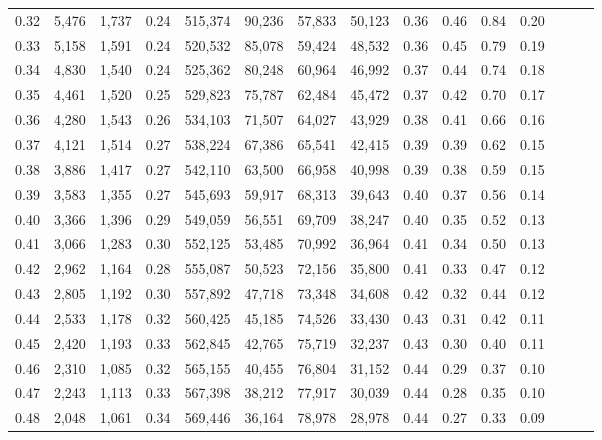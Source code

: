 \begin{tabular}{rrrrrrrrrrrrrrr}
0.32 &   5,476 &  1,737 &  0.24 &  515,374 &   90,236 &   57,833 &   50,123 &  0.36 &  0.46 &  0.84 &      0.20 \\
0.33 &   5,158 &  1,591 &  0.24 &  520,532 &   85,078 &   59,424 &   48,532 &  0.36 &  0.45 &  0.79 &      0.19 \\
0.34 &   4,830 &  1,540 &  0.24 &  525,362 &   80,248 &   60,964 &   46,992 &  0.37 &  0.44 &  0.74 &      0.18 \\
0.35 &   4,461 &  1,520 &  0.25 &  529,823 &   75,787 &   62,484 &   45,472 &  0.37 &  0.42 &  0.70 &      0.17 \\
0.36 &   4,280 &  1,543 &  0.26 &  534,103 &   71,507 &   64,027 &   43,929 &  0.38 &  0.41 &  0.66 &      0.16 \\
0.37 &   4,121 &  1,514 &  0.27 &  538,224 &   67,386 &   65,541 &   42,415 &  0.39 &  0.39 &  0.62 &      0.15 \\
0.38 &   3,886 &  1,417 &  0.27 &  542,110 &   63,500 &   66,958 &   40,998 &  0.39 &  0.38 &  0.59 &      0.15 \\
0.39 &   3,583 &  1,355 &  0.27 &  545,693 &   59,917 &   68,313 &   39,643 &  0.40 &  0.37 &  0.56 &      0.14 \\
0.40 &   3,366 &  1,396 &  0.29 &  549,059 &   56,551 &   69,709 &   38,247 &  0.40 &  0.35 &  0.52 &      0.13 \\
0.41 &   3,066 &  1,283 &  0.30 &  552,125 &   53,485 &   70,992 &   36,964 &  0.41 &  0.34 &  0.50 &      0.13 \\
0.42 &   2,962 &  1,164 &  0.28 &  555,087 &   50,523 &   72,156 &   35,800 &  0.41 &  0.33 &  0.47 &      0.12 \\
0.43 &   2,805 &  1,192 &  0.30 &  557,892 &   47,718 &   73,348 &   34,608 &  0.42 &  0.32 &  0.44 &      0.12 \\
0.44 &   2,533 &  1,178 &  0.32 &  560,425 &   45,185 &   74,526 &   33,430 &  0.43 &  0.31 &  0.42 &      0.11 \\
0.45 &   2,420 &  1,193 &  0.33 &  562,845 &   42,765 &   75,719 &   32,237 &  0.43 &  0.30 &  0.40 &      0.11 \\
0.46 &   2,310 &  1,085 &  0.32 &  565,155 &   40,455 &   76,804 &   31,152 &  0.44 &  0.29 &  0.37 &      0.10 \\
0.47 &   2,243 &  1,113 &  0.33 &  567,398 &   38,212 &   77,917 &   30,039 &  0.44 &  0.28 &  0.35 &      0.10 \\
0.48 &   2,048 &  1,061 &  0.34 &  569,446 &   36,164 &   78,978 &   28,978 &  0.44 &  0.27 &  0.33 &      0.09 \\

\end{tabular}
